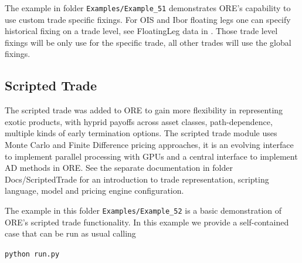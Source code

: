 The example in folder {\tt Examples/Example\_51} demonstrates ORE's capability to use custom trade specific fixings. For OIS and Ibor floating legs one can specify historical fixing on a trade level, see FloatingLeg data in \cite{products}. Those trade level fixings will be only use for the specific trade, all other trades will use the global fixings.

\subsection{Scripted Trade}%
\label{example:52}

The scripted trade was added to ORE to gain more flexibility in representing exotic products, with hyprid payoffs across
asset classes, path-dependence, multiple kinds of early termination options. The scripted trade module uses Monte Carlo and
Finite Difference pricing approaches, it is an evolving interface to implement parallel processing with GPUs and a central
interface to implement AD methods in ORE. See the separate documentation in folder Docs/ScriptedTrade for an introduction to trade
representation, scripting language, model and pricing engine configuration.

\medskip
The example in this folder {\tt Examples/Example\_52} is a basic demonstration of ORE's scripted trade functionality.
In this example we provide a self-contained case that can be run as usual calling

\medskip
\centerline{\tt python run.py}

\medskip

